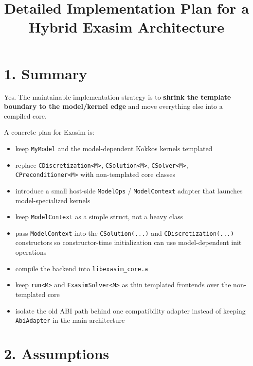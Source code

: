 \documentclass[11pt]{article}
\title{Detailed Implementation Plan for a Hybrid Exasim Architecture}
\author{}
\date{}
\begin{document}
\maketitle

\section*{1. Summary}

Yes. The maintainable implementation strategy is to \textbf{shrink the template boundary to the model/kernel edge} and move everything else into a compiled core.

A concrete plan for Exasim is:

\begin{itemize}[leftmargin=*]
\item keep \texttt{MyModel} and the model-dependent Kokkos kernels templated
\item replace \texttt{CDiscretization<M>}, \texttt{CSolution<M>}, \texttt{CSolver<M>}, \texttt{CPreconditioner<M>} with non-templated core classes
\item introduce a small host-side \texttt{ModelOps} / \texttt{ModelContext} adapter that launches model-specialized kernels
\item keep \texttt{ModelContext} as a simple struct, not a heavy class
\item pass \texttt{ModelContext} into the \texttt{CSolution(...)} and \texttt{CDiscretization(...)} constructors so constructor-time initialization can use model-dependent init operations
\item compile the backend into \texttt{libexasim\_core.a}
\item keep \texttt{run<M>} and \texttt{ExasimSolver<M>} as thin templated frontends over the non-templated core
\item isolate the old ABI path behind one compatibility adapter instead of keeping \texttt{AbiAdapter} in the main architecture
\end{itemize}

\section*{2. Assumptions}
\end{document}
